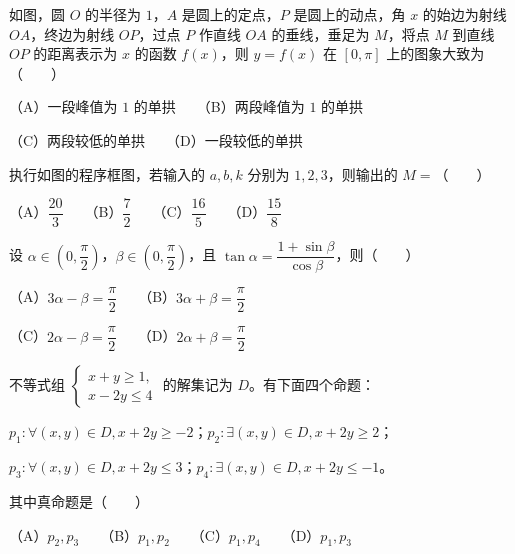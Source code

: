 \begin{question}
如图，圆 $O$ 的半径为 $1$，$A$ 是圆上的定点，$P$ 是圆上的动点，角 $x$ 的始边为射线 $OA$，终边为射线 $OP$，过点 $P$ 作直线 $OA$ 的垂线，垂足为 $M$，将点 $M$ 到直线 $OP$ 的距离表示为 $x$ 的函数 $f(x)$，则 $y=f(x)$ 在 $[0,\pi]$ 上的图象大致为\mbox{（　　）}
\nopagebreak[4]
\begin{center}\end{center}
\nopagebreak[4]
（A）一段峰值为 $1$ 的单拱　　（B）两段峰值为 $1$ 的单拱

（C）两段较低的单拱　　（D）一段较低的单拱

\Needspace{0.4\textheight}
\end{question}
\begin{question}
执行如图的程序框图，若输入的 $a,b,k$ 分别为 $1,2,3$，则输出的 $M=$\mbox{（　　）}
\nopagebreak[4]
\begin{center}\end{center}
\nopagebreak[4]
（A）$\dfrac{20}{3}$　　（B）$\dfrac72$　　（C）$\dfrac{16}{5}$　　（D）$\dfrac{15}{8}$

\end{question}
\begin{question}
设 $\alpha\in(0,\dfrac\pi2)$，$\beta\in(0,\dfrac\pi2)$，且 $\tan\alpha=\dfrac{1+\sin\beta}{\cos\beta}$，则\mbox{（　　）}

（A）$3\alpha-\beta=\dfrac\pi2$　　（B）$3\alpha+\beta=\dfrac\pi2$

（C）$2\alpha-\beta=\dfrac\pi2$　　（D）$2\alpha+\beta=\dfrac\pi2$

\end{question}
\begin{question}
不等式组 $\begin{cases}x+y\geqslant1,\\x-2y\leqslant4\end{cases}$ 的解集记为 $D$。有下面四个命题：

$p_1:\forall(x,y)\in D,x+2y\geqslant-2$；$p_2:\exists(x,y)\in D,x+2y\geqslant2$；

$p_3:\forall(x,y)\in D,x+2y\leqslant3$；$p_4:\exists(x,y)\in D,x+2y\leqslant-1$。

其中真命题是\mbox{（　　）}

（A）$p_2,p_3$　　（B）$p_1,p_2$　　（C）$p_1,p_4$　　（D）$p_1,p_3$

\end{question}
